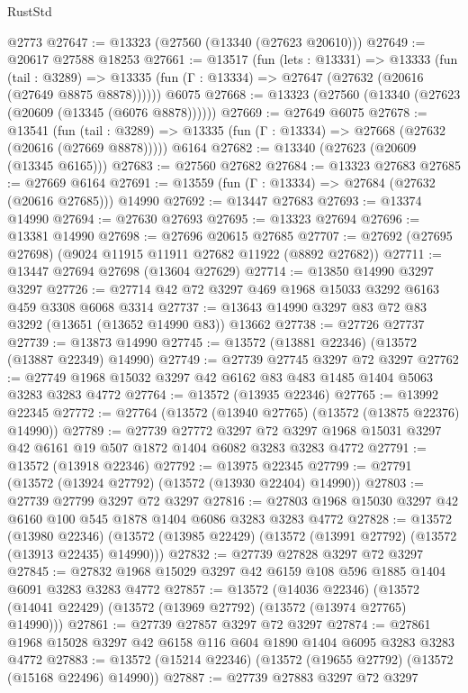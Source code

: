 \begin{lexlean}{RustStd}
\begin{coremodule}
    @2773
@27647 := @13323 (@27560 (@13340 (@27623 @20610)))
@27649 := @20617 @27588 @18253
@27661 := @13517
    (fun (lets : @13331) =>
    @13333
      (fun (tail : @3289) =>
      @13335 (fun (Γ : @13334) => @27647 (@27632 (@20616 (@27649 @8875 @8878))))))
    @6075
@27668 := @13323 (@27560 (@13340 (@27623 (@20609 (@13345 (@6076 @8878))))))
@27669 := @27649 @6075
@27678 := @13541
    (fun (tail : @3289) => @13335 (fun (Γ : @13334) => @27668 (@27632 (@20616 (@27669 @8878)))))
    @6164
@27682 := @13340 (@27623 (@20609 (@13345 @6165)))
@27683 := @27560 @27682
@27684 := @13323 @27683
@27685 := @27669 @6164
@27691 := @13559 (fun (Γ : @13334) => @27684 (@27632 (@20616 @27685))) @14990
@27692 := @13447 @27683
@27693 := @13374 @14990
@27694 := @27630 @27693
@27695 := @13323 @27694
@27696 := @13381 @14990
@27698 := @27696 @20615 @27685
@27707 := @27692 (@27695 @27698) (@9024 @11915 @11911 @27682 @11922 (@8892 @27682))
@27711 := @13447 @27694 @27698 (@13604 @27629)
@27714 := @13850 @14990 @3297 @3297
@27726 := @27714 @42 @72 @3297 @469 @1968 @15033 @3292 @6163 @459 @3308 @6068 @3314
@27737 := @13643 @14990 @3297 @83 @72 @83 @3292 (@13651 (@13652 @14990 @83)) @13662
@27738 := @27726 @27737
@27739 := @13873 @14990
@27745 := @13572 (@13881 @22346) (@13572 (@13887 @22349) @14990)
@27749 := @27739 @27745 @3297 @72 @3297
@27762 := @27749 @1968 @15032 @3297 @42 @6162 @83 @483 @1485 @1404 @5063 @3283 @3283 @4772
@27764 := @13572 (@13935 @22346)
@27765 := @13992 @22345
@27772 := @27764 (@13572 (@13940 @27765) (@13572 (@13875 @22376) @14990))
@27789 := @27739
    @27772
    @3297
    @72
    @3297
    @1968
    @15031
    @3297
    @42
    @6161
    @19
    @507
    @1872
    @1404
    @6082
    @3283
    @3283
    @4772
@27791 := @13572 (@13918 @22346)
@27792 := @13975 @22345
@27799 := @27791 (@13572 (@13924 @27792) (@13572 (@13930 @22404) @14990))
@27803 := @27739 @27799 @3297 @72 @3297
@27816 := @27803 @1968 @15030 @3297 @42 @6160 @100 @545 @1878 @1404 @6086 @3283 @3283 @4772
@27828 := @13572
    (@13980 @22346)
    (@13572 (@13985 @22429) (@13572 (@13991 @27792) (@13572 (@13913 @22435) @14990)))
@27832 := @27739 @27828 @3297 @72 @3297
@27845 := @27832 @1968 @15029 @3297 @42 @6159 @108 @596 @1885 @1404 @6091 @3283 @3283 @4772
@27857 := @13572
    (@14036 @22346)
    (@13572 (@14041 @22429) (@13572 (@13969 @27792) (@13572 (@13974 @27765) @14990)))
@27861 := @27739 @27857 @3297 @72 @3297
@27874 := @27861 @1968 @15028 @3297 @42 @6158 @116 @604 @1890 @1404 @6095 @3283 @3283 @4772
@27883 := @13572 (@15214 @22346) (@13572 (@19655 @27792) (@13572 (@15168 @22496) @14990))
@27887 := @27739 @27883 @3297 @72 @3297

\end{coremodule}
\end{lexlean}
